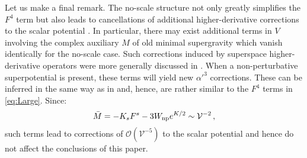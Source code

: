\documentclass[11pt,a4paper]{article}
\newcommand{\be}{\begin{equation}}
\newcommand{\ee}{\end{equation}}
\newcommand\vo{{\mathcal{V}}}
\newcommand{\mc}{\mathcal}
\begin{document}
Let us make a final remark. The no-scale structure not only greatly simplifies the $F^4$ term but also leads to cancellations of additional higher-derivative corrections to the scalar potential \cite{Ciupke:2016agp}. In particular, there may exist additional terms in $V$ involving the complex auxiliary $M$ of old minimal supergravity which vanish identically for the no-scale case. Such corrections induced by superspace higher-derivative operators were more generally discussed in \cite{Ciupke:2016agp}. When a non-perturbative superpotential is present, these terms will yield new $\alpha'^3$ corrections. These can be inferred in the same way as in \cite{Ciupke:2015msa} and, hence, are rather similar to the $F^4$ terms in \eqref{eq:Large}. Since:
\be
\bar{M} = - K_s F^s - 3 W_{\rm np} e^{K/2} \sim \vo^{-2}\,,
\ee
such terms lead to corrections of $\mc{O}(\vo^{-5})$ to the scalar potential and hence do not affect the conclusions of this paper.
\end{document}
